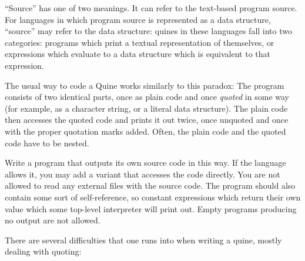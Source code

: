 ``Source'' has one of two meanings. It can refer to the text-based
program source. For languages in which program source is represented as
a data structure, ``source'' may refer to the data structure: quines in
these languages fall into two categories: programs which print a textual
representation of themselves, or expressions which evaluate to a data
structure which is equivalent to that expression.

The usual way to code a Quine works similarly to this paradox: The
program consists of two identical parts, once as plain code and once
\emph{quoted} in some way (for example, as a character string, or a
literal data structure). The plain code then accesses the quoted code
and prints it out twice, once unquoted and once with the proper
quotation marks added. Often, the plain code and the quoted code have to
be nested.

Write a program that outputs its own source code in this way. If the
language allows it, you may add a variant that accesses the code
directly. You are not allowed to read any external files with the source
code. The program should also contain some sort of self-reference, so
constant expressions which return their own value which some top-level
interpreter will print out. Empty programs producing no output are not
allowed.

There are several difficulties that one runs into when writing a quine,
mostly dealing with quoting:

